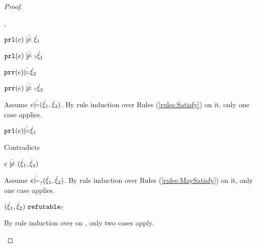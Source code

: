 \begin{proof}
\begin{byCases}
\begin{byCases}
\begin{byCases}
        \item[\cnotsatisfyormay{\hprl{e}}{\hxi_1},\csatisfy{\hprr{e}}{\hxi_2}]
            \begin{pfsteps*}
            \item $\cnotsatisfy{\hprl{e}}{\hxi_1}$  
            \item $\cnotmaysatisfy{\hprl{e}}{\hxi_1}$  
            \item $\mathtt{prr}(e) \dot{\models} \dot{\xi}_2$  
            \item $\cnotmaysatisfy{\hprr{e}}{\hxi_2}$  
            \end{pfsteps*}
            Assume $e \dot{\models} (\dot{\xi}_1 , \dot{\xi}_2)$. By rule induction over Rules (\ref{rules:Satisfy}) on it, only one case applies.
            \begin{byCases}
            \item[\text{(\ref{rule:CSNotIntroPair})}]
                \begin{pfsteps*}
                \item $\mathtt{prl}(e) \dot{\models} \dot{\xi}_1$ 
                \end{pfsteps*}
                Contradicts 
            \end{byCases}
            \begin{pfsteps*}
            \item $\cnotsatisfy{e}{\cpair{\hxi_1}{\hxi_2}}$  
            \end{pfsteps*}
            Assume $e \dot{\models}_{?} (\dot{\xi}_1 , \dot{\xi}_2)$. By rule induction over Rules (\ref{rules:MaySatisfy}) on it, only one case applies.
            \begin{byCases}
            \item[\text{(\ref{rule:CMSNotIntro})}]
                \begin{pfsteps*}
                \item $(\dot{\xi}_1 , \dot{\xi}_2) ~\mathtt{refutable}_?$  
                \end{pfsteps*}
                By rule induction over  on , only two cases apply.
                \begin{byCases}
                \item[\text{(\ref{rule:RXPairL})}]

\end{byCases}
\end{byCases}
\end{byCases}
\end{byCases}
\end{byCases}
\end{proof}
